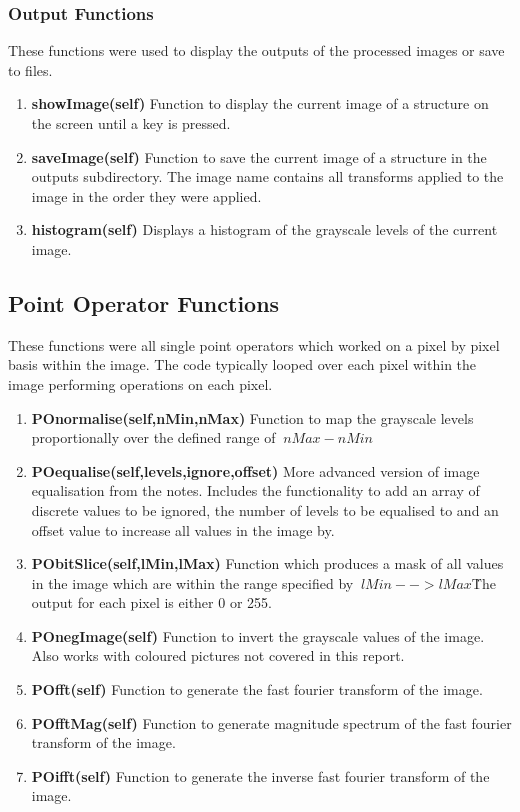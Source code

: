 \documentclass{article}
\begin{document}
\subsubsection{Output Functions}
These functions were used to display the outputs of the processed images or save to files.
\begin{enumerate}
	\item{\textbf{showImage(self)}} Function to display the current image of a structure on the screen until a key is pressed.
	\item{\textbf{saveImage(self)}} Function to save the current image of a structure in the outputs subdirectory. The image name contains all transforms applied to the image in the order they were applied.
	\item{\textbf{histogram(self)}} Displays a histogram of the grayscale levels of the current image.
\end{enumerate}

\subsection{Point Operator Functions}
These functions were all single point operators which worked on a pixel by pixel basis within the image. The code typically looped over each pixel within the image performing operations on each pixel.
\begin{enumerate}
	\item{\textbf{POnormalise(self,nMin,nMax)}} Function to map the grayscale levels proportionally over the defined range of $\ nMax-nMin $\
	\item{\textbf{POequalise(self,levels,ignore,offset)}} More advanced version of image equalisation from the notes. Includes the functionality to add an array of discrete values to be ignored, the number of levels to be equalised to and an offset value to increase all values in the image by. 
	\item{\textbf{PObitSlice(self,lMin,lMax)}} Function which produces a mask of all values in the image which are within the range specified by $\ lMin --> lMax$\. The output for each pixel is either 0 or 255.
	\item{\textbf{POnegImage(self)}} Function to invert the grayscale values of the image. Also works with coloured pictures not covered in this report.
	\item{\textbf{POfft(self)}} Function to generate the fast fourier transform of the image.
	\item{\textbf{POfftMag(self)}} Function to generate magnitude spectrum of the fast fourier transform of the image.
	\item{\textbf{POifft(self)}} Function to generate the inverse fast fourier transform of the image.
\end{enumerate}
\end{document}
